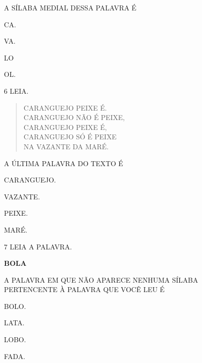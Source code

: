 A SÍLABA MEDIAL DESSA PALAVRA É

\begin{escolha}
\item CA.

\item VA.

\item LO

\item OL.
\end{escolha}

\num{6} LEIA.

\begin{verse}
CARANGUEJO PEIXE É.\\
CARANGUEJO NÃO É PEIXE,\\
CARANGUEJO PEIXE É,\\
CARANGUEJO SÓ É PEIXE\\
NA VAZANTE DA MARÉ.
\end{verse}


A ÚLTIMA PALAVRA DO TEXTO É

\begin{escolha}
\item CARANGUEJO.

\item VAZANTE.

\item PEIXE.

\item MARÉ.
\end{escolha}

\num{7} LEIA A PALAVRA.

\begin{mdframed}[linewidth=2pt,linecolor=azul!20,backgroundcolor=azul!20,roundcorner=2pt]
\textbf{BOLA}
\end{mdframed}

A PALAVRA EM QUE NÃO APARECE NENHUMA SÍLABA PERTENCENTE À PALAVRA QUE VOCÊ LEU É 

\begin{escolha}
\item BOLO.

\item LATA.

\item LOBO.

\item FADA.
\end{escolha}

